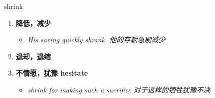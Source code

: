 
\begin{frame}
{\huge shrink}
\begin{center}
\begin{enumerate}\Large
  \item \textbf{降低，减少}
  \begin{itemize}
    \item \em{\Large{His saving quickly shrank. 他的存款急剧减少}}
  \end{itemize}
  \item \textbf{退却，退缩}
  \item \textbf{不情愿，犹豫 hesitate}
  \begin{itemize}
    \item \em{\Large{shrink for making such a sacrifice 对于这样的牺牲犹豫不决}}
  \end{itemize}
\end{enumerate}
\end{center}
\end{frame}
